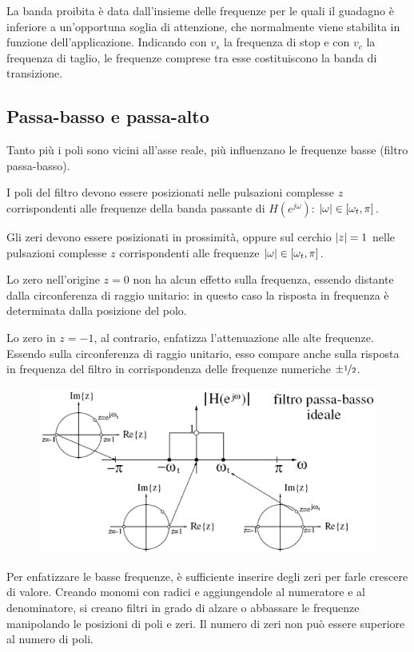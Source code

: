 La banda proibita è data dall'insieme delle frequenze per le quali il guadagno è inferiore a un'opportuna soglia di attenzione, che normalmente viene stabilita in funzione dell'applicazione. Indicando con $v_s$ la frequenza di stop e con $v_c$ la frequenza di taglio, le frequenze comprese tra esse costituiscono la banda di transizione.

\subsection{Passa-basso e passa-alto}
Tanto più i poli sono vicini all'asse reale, più influenzano le frequenze basse (filtro passa-basso).
 
 I poli del filtro devono essere posizionati nelle pulsazioni complesse $z$ corrispondenti alle frequenze della banda passante di $H(e^{j\omega})$: $\left|\omega\right| \in [\omega_t, \pi]$.
 
 Gli zeri devono essere posizionati in prossimità, oppure sul cerchio $\left|z\right| = 1$ nelle pulsazioni complesse $z$ corrispondenti alle frequenze $\left|\omega\right| \in [\omega_t, \pi]$.
 
Lo zero nell'origine $z = 0$ non ha alcun effetto sulla frequenza, essendo distante dalla circonferenza di raggio unitario: in questo caso la risposta in frequenza è determinata dalla posizione del polo.

Lo zero in $z = -1$, al contrario, enfatizza l'attenuazione alle alte frequenze. Essendo sulla circonferenza di raggio unitario, esso compare anche sulla risposta in frequenza del filtro in corrispondenza delle frequenze numeriche $\pm \nicefrac{1}{2}$.

\begin{figure}[h]
	\centering
	\includegraphics[scale=0.4]{Lezioni/Immagini/passabasso}
\end{figure}

Per enfatizzare le basse frequenze, è sufficiente inserire degli zeri per farle crescere di valore. Creando monomi con radici e aggiungendole al numeratore e al denominatore, si creano filtri in grado di alzare o abbassare le frequenze manipolando le posizioni di poli e zeri. Il numero di zeri non può essere superiore al numero di poli.

